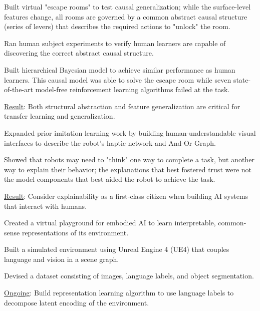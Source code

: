 \begin{cventries}
{\begin{justify}
\end{justify}
\vspace{-1mm}
\begin{cvitems}
  \item Built virtual "escape rooms" to test causal generalization; while the surface-­level features change, all rooms are governed by a common abstract causal structure (series of levers) that describes the required actions to "unlock" the room.
  \item Ran human subject experiments to verify human learners are capable of discovering the correct abstract causal structure.
  \item Built hierarchical Bayesian model to achieve similar performance as human learners.  This causal model was able to solve the escape room while seven state-of-the-art model-free reinforcement learning algorithms failed at the task.
  \item \underline{Result}: Both structural abstraction and feature generalization are critical for transfer learning and generalization.
\end{cvitems}
%
\begin{justify}
\end{justify}
\vspace{-1mm}
\begin{cvitems}
  \item Expanded prior imitation learning work by building human-understandable visual interfaces to describe the robot's haptic network and And-Or Graph.
  \item Showed that robots may need to "think" one way to complete a task, but another way to explain their behavior; the explanations that best fostered trust were not the model components that best aided the robot to achieve the task.
  \item \underline{Result}: Consider explainability as a first-class citizen when building AI systems that interact with humans.
\end{cvitems}
%
\begin{justify}
\end{justify}
\vspace{-1mm}
\begin{cvitems}
  \item Created a virtual playground for embodied AI to learn interpretable, common-sense representations of its environment.
  \item Built a simulated environment using Unreal Engine 4 (UE4) that couples language and vision in a scene graph.
  \item Devised a dataset consisting of images, language labels, and object segmentation.
  \item \underline{Ongoing}: Build representation learning algorithm to use language labels to decompose latent encoding of the environment.
\end{cvitems}
}


\end{cventries}
